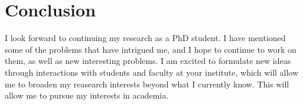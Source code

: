 \section*{Conclusion}
\label{sec:conclusion}

I look forward to continuing my research as a PhD student.
I have mentioned some of the problems that have intrigued me,
and I hope to continue to work on them, as well as new interesting problems.
I am excited to formulate new ideas through interactions with students and faculty at your institute,
which will allow me to broaden my reasearch interests beyond what I currently know.
This will allow me to pursue my interests in academia.
